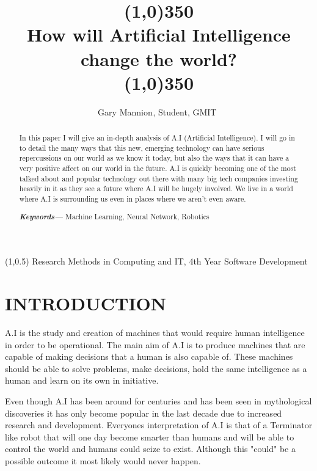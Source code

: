\documentclass[letterpaper, 10 pt, conference]{ieeeconf}  %
\title{\line(1,0){350}\\How will Artificial Intelligence change the world?\\\line(1,0){350}}
\author{Gary Mannion$^{}$, Student, GMIT $^{}$%
}
\begin{document}
\begin{textblock}{9}(1,0.5)
\noindent\small Research Methods in Computing and IT, 4th Year Software Development
\end{textblock}


\maketitle
\thispagestyle{empty}
\pagestyle{empty}


\begin{abstract} \newline
In this paper I will give an in-depth analysis of A.I (Artificial Intelligence). I will go in to detail the many ways that this new, emerging technology can have serious repercussions on our world as we know it today, but also the ways that it can have a very positive affect on our world in the future. A.I is quickly becoming one of the most talked about and popular technology out there with many big tech companies investing heavily in it as they see a future where A.I will be hugely involved. We live in a world where A.I is surrounding us even in places where we aren't even aware. \vspace{2mm}

\textbf{\textit{Keywords---}} Machine Learning, Neural Network, Robotics
\end{abstract}


\section{INTRODUCTION}

A.I is the study and creation of machines that would require human intelligence in order to be operational. The main aim of A.I is to produce machines that are capable of making decisions that a human is also capable of. These machines should be able to solve problems, make decisions, hold the same intelligence as a human and learn on its own in initiative. 

Even though A.I has been around for centuries and has been seen in mythological discoveries it has only become popular in the last decade due to increased research and development. Everyones interpretation of A.I is that of a Terminator like robot that will one day become smarter than humans and will be able to control the world and humans could seize to exist. Although this "could" be a possible outcome it most likely would never happen. 
\end{document}
